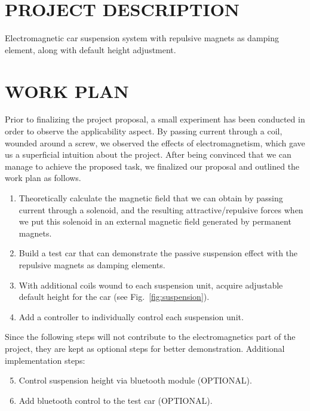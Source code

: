 \documentclass[a4paper, 10pt, conference]{IEEEtran}
\begin{document}
\section{PROJECT DESCRIPTION}
Electromagnetic car suspension system with repulsive magnets as damping element, along with default height adjustment.    

\section{WORK PLAN}
Prior to finalizing the project proposal, a small experiment has been conducted in order to observe the applicability aspect. By passing current through a coil, wounded around a screw, we observed the effects of electromagnetism, which gave us a superficial intuition about the project. After being convinced that we can manage to achieve the proposed task, we finalized our proposal and outlined the work plan as follows.

\begin{enumerate}
    \item Theoretically calculate the magnetic field that we can obtain by passing current through a solenoid, and the resulting attractive/repulsive forces when we put this solenoid in an external magnetic field generated by permanent magnets.
    \item Build a test car that can demonstrate the passive suspension effect with the repulsive magnets as damping elements. 
    \item With additional coils wound to each suspension unit, acquire adjustable default height for the car (see Fig.~\ref{fig:suspension}).
    \item Add a controller to individually control each suspension unit.
\end{enumerate}
Since the following steps will not contribute to the electromagnetics part of the project, they are kept as optional steps for better demonstration. Additional implementation steps:
\begin{enumerate}
    \setcounter{enumi}{4}
    \item Control suspension height via bluetooth module (OPTIONAL).
    \item Add bluetooth control to the test car (OPTIONAL).
\end{enumerate}
\end{document}
